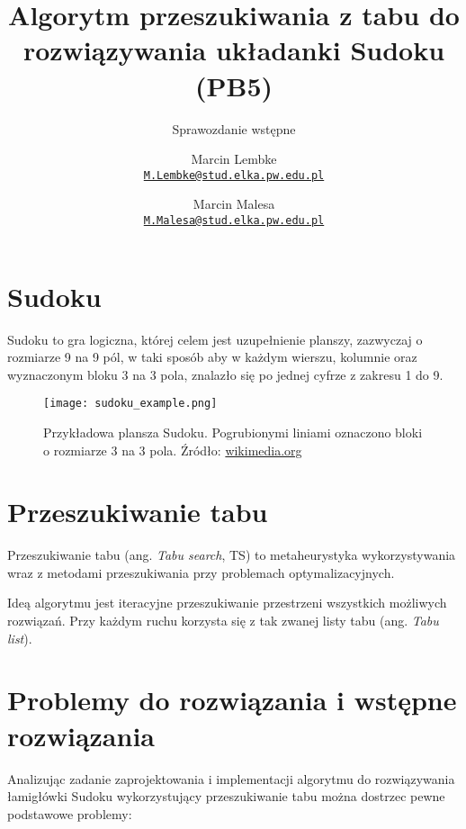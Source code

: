 \documentclass[]{project_report}
\author{%
	Marcin Lembke\\
	\texttt{\href{mailto:M.Lembke@stud.elka.pw.edu.pl}%
			{\nolinkurl{M.Lembke@stud.elka.pw.edu.pl}}}
	\and
	Marcin Malesa\\
	\texttt{\href{mailto:M.Malesa@stud.elka.pw.edu.pl}%
			{\nolinkurl{M.Malesa@stud.elka.pw.edu.pl}}}
}
\title{Algorytm przeszukiwania z tabu do rozwiązywania układanki Sudoku (PB5)}
\subtitle{Sprawozdanie wstępne}
\begin{document}
	\maketitle
	
	\section{Sudoku}
	Sudoku to gra logiczna, której celem jest uzupełnienie planszy, zazwyczaj o rozmiarze 9 na 9 pól, w taki sposób aby w każdym wierszu, kolumnie oraz wyznaczonym bloku 3 na 3 pola, znalazło się po jednej cyfrze z zakresu 1 do 9.
	
	\begin{figure}[H]
		\centering
		\texttt{[image: sudoku\_example.png]}
		\caption{Przykładowa plansza Sudoku. Pogrubionymi liniami oznaczono bloki o rozmiarze 3 na 3 pola. Źródło: \href{https://upload.wikimedia.org/wikipedia/commons/2/2d/Sudoku_przyklad.png}{wikimedia.org}}
	\end{figure}
	
	\section{Przeszukiwanie tabu}
	Przeszukiwanie tabu (ang. \textit{Tabu search}, TS) to metaheurystyka wykorzystywania wraz z metodami przeszukiwania przy problemach optymalizacyjnych.
	
	Ideą algorytmu jest iteracyjne przeszukiwanie przestrzeni wszystkich możliwych rozwiązań. Przy każdym ruchu korzysta się z tak zwanej listy tabu (ang. \textit{Tabu list}).
	
	\section{Problemy do rozwiązania i wstępne rozwiązania}
	Analizując zadanie zaprojektowania i implementacji algorytmu do rozwiązywania łamigłówki Sudoku wykorzystujący przeszukiwanie tabu można dostrzec pewne podstawowe problemy:
	
\end{document}

